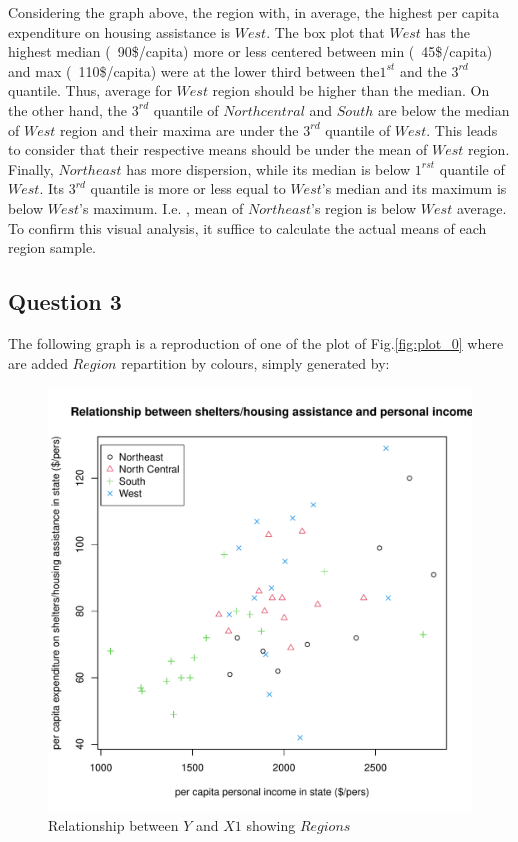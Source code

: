 \documentclass[12pt,letterpaper]{article}
\begin{document}
Considering the graph above, the region with, in average, the highest per capita expenditure on housing assistance is $West$. The box plot that $West$ has the highest median (~90\$/capita) more or less centered between min (~45\$/capita) and max (~110\$/capita) were at the lower third between  the$ 1^{st}$ and the $3^{rd}$ quantile. Thus, average for $West$ region should be higher than the median. On the other hand, the $3^{rd}$ quantile of $North central$  and $South$ are below the median of $West$ region and their maxima are under the $3^{rd}$ quantile of $West$. This leads to consider that their respective means should be under the mean of $West$ region. 
Finally, $Northeast$ has more dispersion, while its median is below $1^{rst}$ quantile of $West$. Its $3^{rd}$ quantile is more or less equal to $West$'s median and its maximum is below $West$'s maximum. I.e. ,  mean of $Northeast$'s region is below $West$ average.
\\
To confirm this visual analysis, it suffice to calculate the actual means of each region sample.

\subsection*{Question 3}

The following graph is a reproduction of one of the plot of  Fig.\ref{fig:plot_0} where are added $Region$ repartition by colours, simply generated by:

  

\begin{figure}[h!]\centering
	\caption{\footnotesize Relationship between $Y$ and $X1$ showing $Regions$ }
	\label{fig:plot_3}
	\includegraphics[width=.85\textwidth]{YX1Region.pdf}
\end{figure}
\end{document}
